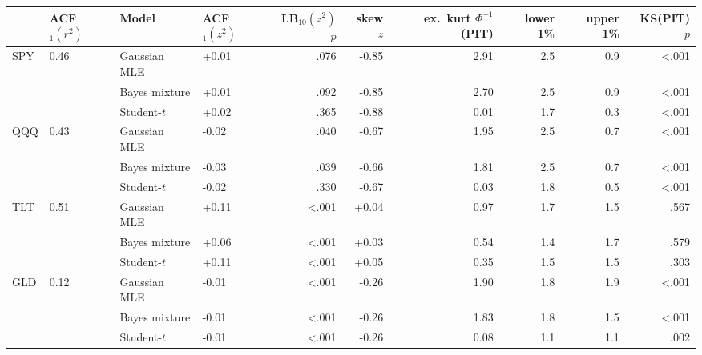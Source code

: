 \begin{tabular}{llllrrrrrr}\toprule
 & ACF$_1(r^2)$ & Model & ACF$_1(z^2)$ & LB$_{10}(z^2)$ $p$ & skew $z$ & ex.\ kurt $\Phi^{-1}$(PIT) & lower 1\% & upper 1\% & KS(PIT) $p$\\\midrule
SPY & 0.46 & Gaussian MLE & +0.01 & .076 & -0.85 & 2.91 & 2.5 & 0.9 & <.001 \\
 &  & Bayes mixture & +0.01 & .092 & -0.85 & 2.70 & 2.5 & 0.9 & <.001 \\
 &  & Student-$t$ & +0.02 & .365 & -0.88 & 0.01 & 1.7 & 0.3 & <.001 \\
\midrule
QQQ & 0.43 & Gaussian MLE & -0.02 & .040 & -0.67 & 1.95 & 2.5 & 0.7 & <.001 \\
 &  & Bayes mixture & -0.03 & .039 & -0.66 & 1.81 & 2.5 & 0.7 & <.001 \\
 &  & Student-$t$ & -0.02 & .330 & -0.67 & 0.03 & 1.8 & 0.5 & <.001 \\
\midrule
TLT & 0.51 & Gaussian MLE & +0.11 & <.001 & +0.04 & 0.97 & 1.7 & 1.5 & .567 \\
 &  & Bayes mixture & +0.06 & <.001 & +0.03 & 0.54 & 1.4 & 1.7 & .579 \\
 &  & Student-$t$ & +0.11 & <.001 & +0.05 & 0.35 & 1.5 & 1.5 & .303 \\
\midrule
GLD & 0.12 & Gaussian MLE & -0.01 & <.001 & -0.26 & 1.90 & 1.8 & 1.9 & <.001 \\
 &  & Bayes mixture & -0.01 & <.001 & -0.26 & 1.83 & 1.8 & 1.5 & <.001 \\
 &  & Student-$t$ & -0.01 & <.001 & -0.26 & 0.08 & 1.1 & 1.1 & .002 \\
\bottomrule\end{tabular}
